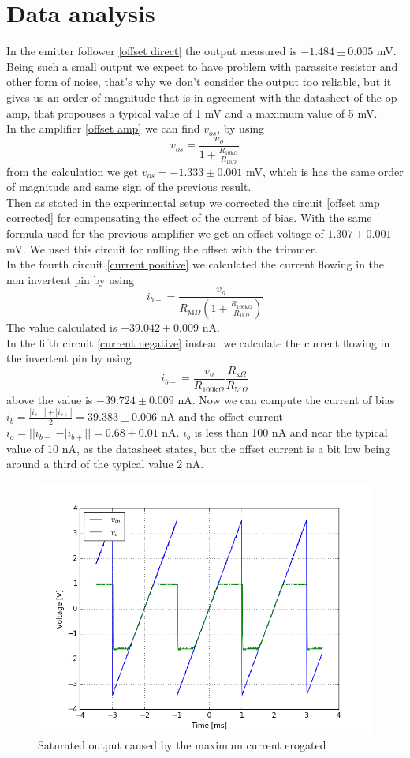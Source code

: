 \section{Data analysis}
In the emitter follower \eqref{offset direct} the output measured is $-1.484 \pm 0.005$ mV. Being such a small output we expect to have problem with parassite resistor and other form of noise, that's why we don't consider the output too reliable, but it gives us an order of magnitude that is in agreement with the datasheet of the op-amp, that propouses a typical value of 1 mV and a maximum value of 5 mV.\\
In the amplifier \eqref{offset amp} we can find $v_{os}$, by using
\[v_{os} = \frac{v_{o}}{1 + \frac{R_{10\text{k}\Omega}}{R_{10\Omega}}}\]
from the calculation we get $v_{os} = -1.333 \pm 0.001$ mV, which is has the same order of magnitude and same sign of the previous result.\\
Then as stated in the experimental setup we corrected the circuit \eqref{offset amp corrected} for compensating the effect of the current of bias. With the same formula used for the previous amplifier we get an offset voltage of $1.307 \pm 0.001$ mV. We used this circuit for nulling the offset with the trimmer.\\
In the fourth circuit \eqref{current positive} we calculated the current flowing in the non invertent pin by using $$i_{b+} = \frac{v_{o}}{R_{\text{M}\Omega} (1 + \frac{R_{100\text{k}\Omega}}{R_{1\text{k}\Omega}})}$$ The value calculated is $-39.042 \pm 0.009$ nA.\\
In the fifth circuit \eqref{current negative} instead we calculate the current flowing in the invertent pin by using 
\[i_{b-} = \frac{v_{o}}{R_{100\text{k}\Omega}} \frac{R_{\text{k}\Omega}}{R_{\text{M}\Omega}}\]above
 the value is $-39.724 \pm 0.009$ nA. Now we can compute the current of bias $i_b = \frac{|i_{b-}| + |i_{b+}|}{2} = 39.383 \pm 0.006$ nA and the offset current $i_o = ||i_{b-}| - |i_{b+}|| = 0.68 \pm 0.01$ nA. $i_b$ is less than 100 nA and near the typical value of 10 nA, as the datasheet states, but the offset current is a bit low being around a third of the typical value 2 nA.
\begin{figure}[H]
\centering
\includegraphics[width=.6\textwidth]{3/Maximum_current_erogated.png}
\caption{Saturated output caused by the maximum current erogated}
\end{figure}

